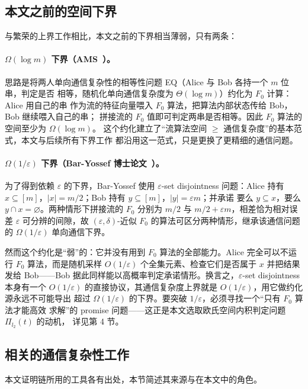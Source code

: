 \documentclass[UTF8, 11pt, a4paper, linestretch=1.15]{ctexart}
\theoremstyle{zhstyle}
\newcommand{\eps}{\varepsilon}
\newcommand{\Fzero}{F_0}
\begin{document}
	\subsection{本文之前的空间下界}
	
	与繁荣的上界工作相比，本文之前的下界相当薄弱，只有两条：
	
	\paragraph{$\Omega(\log m)$ 下界（AMS~\cite{AMS99}）。}
	思路是将两人单向通信复杂性的相等性问题 EQ（Alice 与 Bob 各持一个 $m$ 位串，判定是否
	相等，随机化单向通信复杂度为 $\Theta(\log m)$）约化为 $\Fzero$ 计算：Alice 用自己的串
	作为流的特征向量喂入 $\Fzero$ 算法，把算法内部状态传给 Bob，Bob 继续喂入自己的串；
	拼接流的 $\Fzero$ 值即可判定两串是否相等。因此 $\Fzero$ 算法的空间至少为 $\Omega(\log m)$。
	这个约化建立了“流算法空间 $\geq$ 通信复杂度”的基本范式，本文与后续所有下界工作
	都沿用这一范式，只是更换了更精细的通信问题。
	
	\paragraph{$\Omega(1/\eps)$ 下界（Bar-Yossef 博士论文~\cite{BarYossef02}）。}
	为了得到依赖 $\eps$ 的下界，Bar-Yossef 使用 $\eps$-set disjointness 问题：Alice 持有
	$x \subseteq [m]$，$|x| = m/2$；Bob 持有 $y \subseteq [m]$，$|y| = \eps m$；并承诺
	要么 $y \subseteq x$，要么 $y \cap x = \varnothing$。两种情形下拼接流的 $\Fzero$ 分别为
	$m/2$ 与 $m/2 + \eps m$，相差恰为相对误差 $\eps$ 可分辨的间隙，故 $(\eps,\delta)$-近似
	$\Fzero$ 的算法可区分两种情形，继承该通信问题的 $\Omega(1/\eps)$ 单向通信下界。
	
	然而这个约化是“弱”的：它并没有用到 $\Fzero$ 算法的全部能力。Alice 完全可以不运行
	$\Fzero$ 算法，而是随机采样 $O(1/\eps)$ 个全集元素、检查它们是否属于 $x$ 并把结果发给
	Bob——Bob 据此同样能以高概率判定承诺情形。换言之，$\eps$-set disjointness 本身有一个
	$O(1/\eps)$ 的直接协议，其通信复杂度上界就是 $O(1/\eps)$，用它做约化源永远不可能导出
	超过 $\Omega(1/\eps)$ 的下界。要突破 $1/\eps$，必须寻找一个“只有 $\Fzero$ 算法才能高效
	求解”的 promise 问题——这正是本文选取欧氏空间内积判定问题 $\Pi_{l_2}(t)$ 的动机，
	详见第 4 节。
	
	\subsection{相关的通信复杂性工作}
	
	本文证明链所用的工具各有出处，本节简述其来源与在本文中的角色。
	
\end{document}
